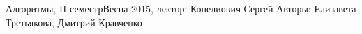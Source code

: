 


\BigHeader
	{Алгоритмы, II семестр}{Весна 2015, лектор: Копелиович Сергей }
	{Авторы: Елизавета Третьякова, Дмитрий Кравченко}




